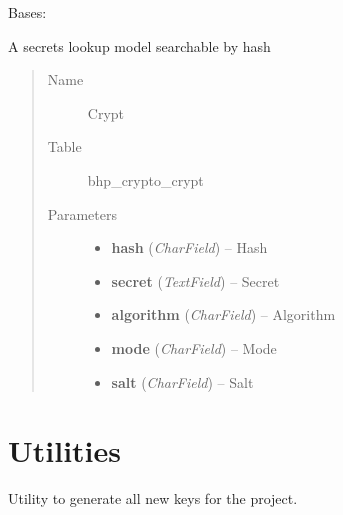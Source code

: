 \documentclass[letterpaper,10pt,english]{sphinxmanual}
\begin{document}
\begin{fulllineitems}
\label{models:bhp_crypto.models.Crypt}
Bases: 

A secrets lookup model searchable by hash
\begin{quote}\begin{description}
\item[{Name }] \leavevmode
Crypt

\item[{Table }] \leavevmode
bhp\_crypto\_crypt

\item[{Parameters}] \leavevmode\begin{itemize}
\item {} 
\textbf{hash} (\emph{CharField}) -- Hash

\item {} 
\textbf{secret} (\emph{TextField}) -- Secret

\item {} 
\textbf{algorithm} (\emph{CharField}) -- Algorithm

\item {} 
\textbf{mode} (\emph{CharField}) -- Mode

\item {} 
\textbf{salt} (\emph{CharField}) -- Salt

\end{itemize}

\end{description}\end{quote}

\end{fulllineitems}



\chapter{Utilities}
\label{utilities::doc}\label{utilities:module-bhp_crypto.utils}\label{utilities:utilities}

\begin{fulllineitems}
\label{utilities:bhp_crypto.utils.setup_new_keys}
Utility to generate all new keys for the project.

\end{fulllineitems}
\end{document}
